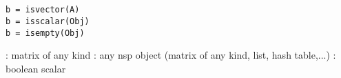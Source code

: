 
\begin{mandesc}
   \\
   \\
\end{mandesc}
\begin{calling_sequence}
\begin{verbatim}
b = isvector(A)
b = isscalar(Obj)
b = isempty(Obj)
\end{verbatim}
\end{calling_sequence}

\begin{parameters}
  \begin{varlist}
    : matrix of any kind
    : any nsp object (matrix of any kind, list, hash table,...)
    :  boolean scalar
  \end{varlist}
\end{parameters}

